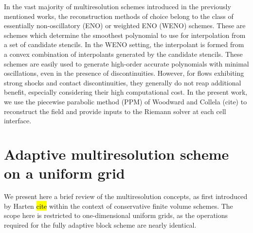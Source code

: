\documentclass[]{article}
\begin{document}
        In the vast majority of multiresolution schemes introduced in the
        previously mentioned works, the reconstruction methods of choice belong
        to the class of essentially non-oscillatory (ENO) or weighted ENO
        (WENO) schemes. These are schemes which determine the smoothest
        polynomial to use for interpolation from a set of candidate stencils.
        In the WENO setting, the interpolant is formed from a convex
        combination of interpolants generated by the candidate stencils. These
        schemes are easily used to generate high-order accurate polynomials
        with minimal oscillations, even in the presence of discontinuities.
        However, for flows exhibiting strong shocks and contact
        discontinuities, they generally do not reap additional benefit,
        especially considering their high computational cost. In the present
        work, we use the piecewise parabolic method (PPM) of Woodward and
        Collela (cite) to reconstruct the field and provide inputs to the
        Riemann solver at each cell interface.

%

\section{Adaptive multiresolution scheme on a uniform grid}

    We present here a brief review of the multiresolution concepts, as first
    introduced by Harten \hl{cite} within the context of conservative finite
    volume schemes. The scope here is restricted to one-dimensional uniform
    grids, as the operations required for the fully adaptive block scheme are
    nearly identical.
\end{document}

